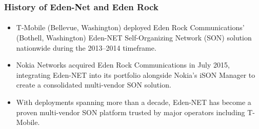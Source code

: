 \begin{verblatex}

\begin{frame}[fragile,plain,label=edenNetHistory]
    \frametitle{History of Eden-Net and Eden Rock}
    \framesubtitle{}

\begin{itemize}
  \item T-Mobile (Bellevue, Washington) deployed Eden Rock Communications' (Bothell,
    Washington) Eden-NET Self-Organizing Network (SON) solution nationwide during the
    2013–2014 timeframe.
  \item Nokia Networks acquired Eden Rock Communications in July 2015, integrating
    Eden-NET into its portfolio alongside Nokia's iSON Manager to create a consolidated
    multi-vendor SON solution.
  \item With deployments spanning more than a decade, Eden-NET has become a proven
    multi-vendor SON platform trusted by major operators including T-Mobile.
\end{itemize}


\end{frame}
\end{verblatex}
